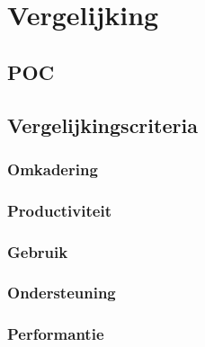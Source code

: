 \chapter{Vergelijking}
\label{chap:vergelijking}

\section{POC} %
\section{Vergelijkingscriteria} %

\subsection{Omkadering}
\subsection{Productiviteit}
\subsection{Gebruik}
\subsection{Ondersteuning}
\subsection{Performantie}